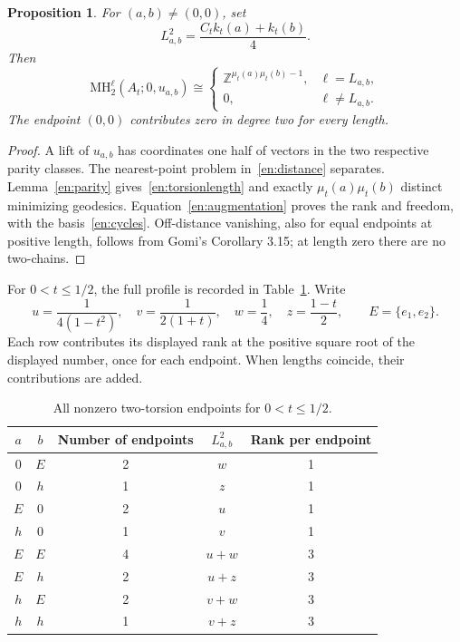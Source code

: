 \documentclass[12pt]{amsart}
\newcommand{\PropositionName}{Proposition}
\newtheorem{prop}[thm]{\PropositionName}
\theoremstyle{definition}
\theoremstyle{remark}
\numberwithin{equation}{section}
\newcommand{\Z}{\mathbb{Z}}
\newcommand{\MH}{\mathrm{MH}}
\begin{document}
\begin{prop}\label{en:profile}
For $(a,b)\ne(0,0)$, set
\begin{equation}\label{en:torsionlength}
L_{a,b}^2=\frac{C_t k_t(a)+k_t(b)}4.
\end{equation}
Then
\begin{equation}\label{en:torsionrank}
\MH_2^\ell(A_t;0,u_{a,b})\cong
\begin{cases}
\Z^{\mu_t(a)\mu_t(b)-1},&\ell=L_{a,b},\\
0,&\ell\ne L_{a,b}.
\end{cases}
\end{equation}
The endpoint $(0,0)$ contributes zero in degree two for every length.
\end{prop}
\begin{proof}
A lift of $u_{a,b}$ has coordinates one half of vectors in the two respective parity classes. The nearest-point problem in~\eqref{en:distance} separates. Lemma~\ref{en:parity} gives~\eqref{en:torsionlength} and exactly $\mu_t(a)\mu_t(b)$ distinct minimizing geodesics. Equation~\eqref{en:augmentation} proves the rank and freedom, with the basis~\eqref{en:cycles}. Off-distance vanishing, also for equal endpoints at positive length, follows from Gomi's Corollary 3.15; at length zero there are no two-chains.
\end{proof}

For $0<t\leq1/2$, the full profile is recorded in Table~\ref{en:table}. Write
\[
u=\frac1{4(1-t^2)},\quad v=\frac1{2(1+t)},\quad
w=\frac14,\quad z=\frac{1-t}{2},\qquad E=\{e_1,e_2\}.
\]
Each row contributes its displayed rank at the positive square root of the displayed number, once for each endpoint. When lengths coincide, their contributions are added.

\begin{table}[ht]
\centering
\caption{All nonzero two-torsion endpoints for $0<t\leq1/2$.}\label{en:table}
\begin{tabular}{ccccc}
\hline
$a$&$b$&Number of endpoints&$L_{a,b}^2$&Rank per endpoint\\\hline
$0$&$E$&2&$w$&1\\
$0$&$h$&1&$z$&1\\
$E$&$0$&2&$u$&1\\
$h$&$0$&1&$v$&1\\
$E$&$E$&4&$u+w$&3\\
$E$&$h$&2&$u+z$&3\\
$h$&$E$&2&$v+w$&3\\
$h$&$h$&1&$v+z$&3\\\hline
\end{tabular}
\end{table}
\end{document}

